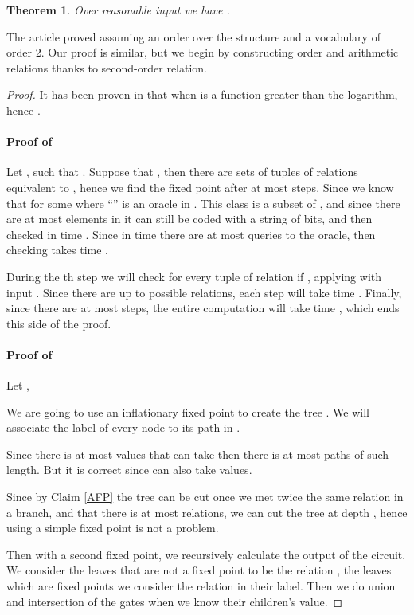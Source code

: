\documentclass[a4paper,12pt]{article}
\newtheorem{theorem}{Theorem}[section]
\theoremstyle{definition}
\begin{document}
\begin{theorem}\label{tifp}
  Over reasonable input we have .
\end{theorem}

The article \cite{DETH} proved
 assuming an order over
the structure and a vocabulary of order 2. Our proof is similar, but
we begin by constructing order and arithmetic relations thanks to
second-order relation.

\begin{proof}
  It has been proven in \cite{alternation} that when  is a function
  greater than the logarithm,  hence
  .


 \paragraph{ Proof of
   }
 Let , such that . Suppose that , then there are
  sets of tuples of relations
 equivalent to , hence we find the fixed point after at most
  steps. Since  we know that
  for some  where ``''
 is an oracle in . This class is a subset of
 , and since there are at most
  elements in  it can still be coded with
 a string of bits, and then checked in time
 . Since in time 
 there are at most  queries to the oracle,
 then checking  takes time
 .

  During the th step we will check for every tuple of relation
   if , applying  with input
  . Since there are up to 
  possible relations, each step will take time
  . Finally,
  since there are at most  steps, the entire
  computation will take time
  ,
  which ends this side of the proof.


 \paragraph{ Proof of
   }
  Let , 

  We are going to use an inflationary fixed point to create the tree
  . We will associate the label of every node to its
  path in .

  Since there is at most  values that  can take
  then there is at most  paths of such length.
  But it is correct since  can also take  values.

  Since by Claim \ref{AFP} the tree  can be cut once we met twice
  the same relation in a branch, and that there is at most 
  relations, we can cut the tree at depth , hence using a
  simple fixed point is not a problem. 



  Then with a second fixed point, we recursively calculate the output
  of the circuit. We consider the leaves that are not a fixed point to
  be the relation , the leaves which are fixed points we
  consider the relation in their label. Then we do union and
  intersection of the gates when we know their children's value.




\end{proof}
\end{document}
